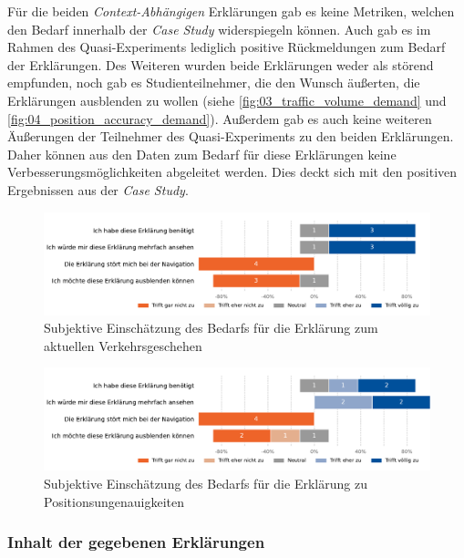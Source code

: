 Für die beiden \textit{Context-Abhängigen} Erklärungen gab es keine Metriken, welchen den Bedarf innerhalb der \textit{Case Study} widerspiegeln können. Auch gab es im Rahmen des Quasi-Experiments lediglich positive Rückmeldungen zum Bedarf der Erklärungen. Des Weiteren wurden beide Erklärungen weder als störend empfunden, noch gab es Studienteilnehmer, die den Wunsch äußerten, die Erklärungen ausblenden zu wollen (siehe \autoref{fig:03_traffic_volume_demand} und \autoref{fig:04_position_accuracy_demand}). Außerdem gab es auch keine weiteren Äußerungen der Teilnehmer des Quasi-Experiments zu den beiden Erklärungen. Daher können aus den Daten zum Bedarf für diese Erklärungen keine Verbesserungsmöglichkeiten abgeleitet werden. Dies deckt sich mit den positiven Ergebnissen aus der \textit{Case Study}.

\begin{figure}[htb!]
    \centering
    \includegraphics[width=\textwidth]{contents/06_model_evaluation/02_evaluation/res/qualitativeFeedback-03_traffic_volume_demand.pdf}
    \caption{Subjektive Einschätzung des Bedarfs für die Erklärung zum aktuellen Verkehrsgeschehen}
    \label{fig:03_traffic_volume_demand}
\end{figure}

\begin{figure}[htb!]
    \centering
    \includegraphics[width=\textwidth]{contents/06_model_evaluation/02_evaluation/res/qualitativeFeedback-04_position_accuracy_demand.pdf}
    \caption{Subjektive Einschätzung des Bedarfs für die Erklärung zu Positionsungenauigkeiten}
    \label{fig:04_position_accuracy_demand}
\end{figure}

\subsubsection{Inhalt der gegebenen Erklärungen}

